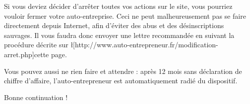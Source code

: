 ﻿Si vous deviez décider d'arrêter toutes vos actions sur le site, vous pourriez vouloir fermer votre auto-entreprise.
Ceci ne peut malheureusement pas se faire directement depuis Internet, afin d'éviter des abus et des désinscriptions sauvages. Il vous faudra donc envoyer une lettre recommandée en suivant la procédure décrite sur \l[http://www.auto-entrepreneur.fr/modification-arret.php]{cette page}.

Vous pouvez aussi ne rien faire et attendre : après 12 mois sans déclaration de chiffre d'affaire, l'auto-entrepreneur est automatiquement radié du dispositif.

Bonne continuation !